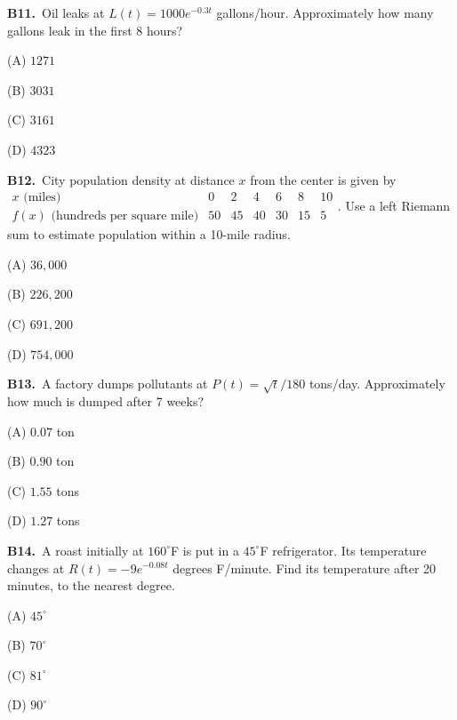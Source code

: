 \documentclass[11pt]{article}
\begin{document}
\bigskip\noindent\textbf{B11.}\ Oil leaks at $L(t)=1000e^{-0.3t}$ gallons/hour. Approximately how many gallons leak in the first 8 hours?
\begin{list}{}{\setlength{\leftmargin}{3em}\setlength{\labelwidth}{2.5em}\setlength{\itemsep}{0pt}\setlength{\topsep}{2pt}}
\item[(A)] $1271$
\item[(B)] $3031$
\item[(C)] $3161$
\item[(D)] $4323$
\end{list}

\bigskip\noindent\textbf{B12.}\ City population density at distance $x$ from the center is given by $\begin{array}{c|rrrrrr}x\text{ (miles)}&0&2&4&6&8&10\\\hline f(x)\text{ (hundreds per square mile)}&50&45&40&30&15&5\end{array}$. Use a left Riemann sum to estimate population within a 10-mile radius.
\begin{list}{}{\setlength{\leftmargin}{3em}\setlength{\labelwidth}{2.5em}\setlength{\itemsep}{0pt}\setlength{\topsep}{2pt}}
\item[(A)] $36{,}000$
\item[(B)] $226{,}200$
\item[(C)] $691{,}200$
\item[(D)] $754{,}000$
\end{list}

\bigskip\noindent\textbf{B13.}\ A factory dumps pollutants at $P(t)=\sqrt t/180$ tons/day. Approximately how much is dumped after 7 weeks?
\begin{list}{}{\setlength{\leftmargin}{3em}\setlength{\labelwidth}{2.5em}\setlength{\itemsep}{0pt}\setlength{\topsep}{2pt}}
\item[(A)] $0.07$ ton
\item[(B)] $0.90$ ton
\item[(C)] $1.55$ tons
\item[(D)] $1.27$ tons
\end{list}

\bigskip\noindent\textbf{B14.}\ A roast initially at $160^\circ$F is put in a $45^\circ$F refrigerator. Its temperature changes at $R(t)=-9e^{-0.08t}$ degrees F/minute. Find its temperature after 20 minutes, to the nearest degree.
\begin{list}{}{\setlength{\leftmargin}{3em}\setlength{\labelwidth}{2.5em}\setlength{\itemsep}{0pt}\setlength{\topsep}{2pt}}
\item[(A)] $45^\circ$
\item[(B)] $70^\circ$
\item[(C)] $81^\circ$
\item[(D)] $90^\circ$
\end{list}
\end{document}
